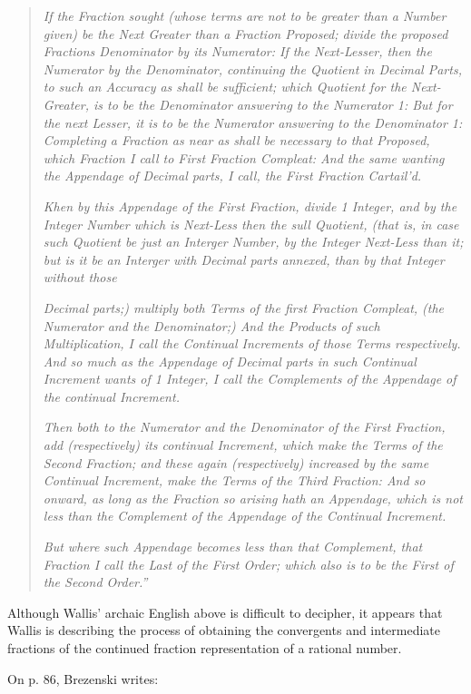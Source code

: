 \begin{quote}
\emph{If the Fraction sought (whose terms are not to be greater than
a Number given) be the Next Greater than a Fraction Proposed; divide the
proposed Fractions Denominator by its Numerator:  If the Next-Lesser, then
the Numerator by the Denominator, continuing the Quotient in Decimal
Parts, to such an Accuracy as shall be sufficient; which Quotient
for the Next-Greater, is to be the Denominator answering to the 
Numerator 1:  But for the next Lesser, it is to be
the Numerator answering to the Denominator 1:  Completing a Fraction
as near as shall be necessary to that Proposed, which Fraction I
call to First Fraction Compleat:  And the same wanting the Appendage of
Decimal parts, I call, the First Fraction Cartail'd.}

\emph{Khen by this Appendage of the First Fraction,
divide 1 Integer, and by the Integer Number which is Next-Less then
the sull Quotient, (that is, in case such Quotient be just an
Interger Number, by the Integer Next-Less than it; but is it be an Interger 
with Decimal parts annexed, than by that Integer
without those}

\emph{Decimal parts;) multiply both Terms of the first Fraction Compleat,
(the Numerator and the Denominator;)  And the Products of such 
Multiplication, I call the Continual Increments of those Terms respectively.
And so much as the Appendage of Decimal parts in such Continual Increment
wants of 1 Integer, I call the Complements of the Appendage of the
continual Increment.}

\emph{Then both to the Numerator and the Denominator of the First 
Fraction, add (respectively) its continual Increment, which make the Terms 
of the Second Fraction; and these again (respectively)
increased by the same Continual
Increment, make the Terms of the Third Fraction:  And so onward,
as long as the Fraction so arising hath an Appendage, which is not less
than the Complement of the Appendage of the Continual Increment.}

\emph{But where such Appendage becomes less than that Complement,
that Fraction I call the Last of the First Order; which also is to
be the First of the Second Order.''}
\end{quote}

Although Wallis' archaic English above is difficult to decipher,
it appears that Wallis is describing the process of 
obtaining the convergents and intermediate fractions of
the continued fraction representation of a rational number.

On p. 86, Brezenski writes:

